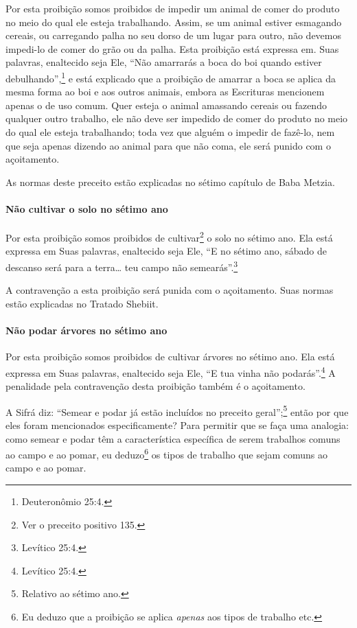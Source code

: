 Por esta proibição somos proibidos de impedir um animal de comer do
produto no meio do qual ele esteja trabalhando. Assim, se um animal
estiver esmagando cereais, ou carregando palha no seu dorso de um lugar
para outro, não devemos impedi-lo de comer do grão ou da palha. Esta
proibição está expressa em. Suas palavras, enaltecido seja Ele, ``Não
amarrarás a boca do boi quando estiver debulhando'',\footnote{Deuteronômio 25:4.}
e está explicado que a proibição de amarrar a boca se aplica da mesma
forma ao boi e aos outros animais, embora as Escrituras mencionem apenas
o de uso comum. Quer esteja o animal amassando cereais ou fazendo
qualquer outro trabalho, ele não deve ser impedido de comer do produto
no meio do qual ele esteja trabalhando; toda vez que alguém o impedir de
fazê-lo, nem que seja apenas dizendo ao animal para que não coma, ele
será punido com o açoitamento.

As normas deste preceito estão explicadas no sétimo capítulo de Baba Metzia.

\paragraph{Não cultivar o solo no sétimo ano}

Por esta proibição somos proibidos de cultivar\footnote{Ver o preceito positivo 135.} o
solo no sétimo ano. Ela está expressa em Suas palavras, enaltecido seja
Ele, ``E no sétimo ano, sábado de descanso será para a terra\ldots{} teu
campo não semearás''.\footnote{Levítico 25:4.}

A contravenção a esta proibição será punida com o açoitamento. Suas
normas estão explicadas no Tratado Shebiit.


\paragraph{Não podar árvores no sétimo ano}

Por esta proibição somos proibidos de cultivar árvores no sétimo ano.
Ela está expressa em Suas palavras, enaltecido seja Ele, ``E tua vinha
não podarás''.\footnote{Levítico 25:4.} A penalidade pela contravenção desta
proibição também é o açoitamento.

A Sifrá diz: ``Semear e podar já estão incluídos no preceito
geral'';\footnote{Relativo ao sétimo ano.} então por que eles foram mencionados
especificamente? Para permitir que se faça uma analogia: como semear e
podar têm a característica específica de serem trabalhos comuns ao
campo e ao pomar, eu deduzo\footnote{Eu deduzo que a proibição se aplica \emph{apenas} aos tipos de trabalho etc.} os tipos de trabalho
que sejam comuns ao campo e ao pomar.

